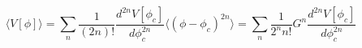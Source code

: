 \begin{equation}
\langle V[\phi] \rangle = \sum_n \frac{1}{(2n)!} \frac {d^{2n} V[\phi_c]}{d
\phi_c^{2n}} \langle (\phi-\phi_c)^{2n} \rangle = \sum_n \frac{1}{2^n n!}
G^n  \frac {d^{2n} V[\phi_c]}{d \phi_c^{2n}}
\end{equation}

